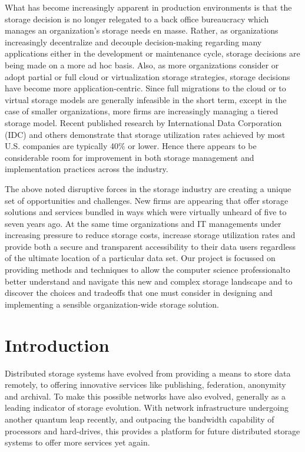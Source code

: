 \documentclass[11pt]{article}
\begin{document}
What has become increasingly apparent in production environments is
that the storage decision is no longer relegated to a back office
bureaucracy which manages an organization’s storage needs en masse.
Rather, as organizations increasingly decentralize and decouple
decision-making regarding many applications either in the development
or maintenance cycle, storage decisions are being made on a more ad
hoc basis. Also, as more organizations consider or adopt partial or
full cloud or virtualization storage strategies, storage decisions
have become more application-centric. Since full migrations to the
cloud or to virtual storage models are generally infeasible in the
short term, except in the case of smaller organizations, more firms
are increasingly managing a tiered storage model. Recent published
research by International Data Corporation (IDC) and others
demonstrate that storage utilization rates achieved by most
U.S. companies are typically 40\% or lower. Hence there appears to be
considerable room for improvement in both storage management and
implementation practices across the industry.

The above noted disruptive forces in the storage industry are creating
a unique set of opportunities and challenges. New firms are appearing
that offer storage solutions and services bundled in ways which were
virtually unheard of five to seven years ago. At the same time
organizations and IT managements under increasing pressure to reduce
storage costs, increase storage utilization rates and provide both a
secure and transparent accessibility to their data users regardless of
the ultimate location of a particular data set. Our project is
focussed on providing methods and techniques to allow the computer
science professionalto better understand and navigate this new and
complex storage landscape and to discover the choices and tradeoffs
that one must consider in designing and implementing a sensible
organization-wide storage solution.

\section{Introduction}
Distributed storage systems have evolved from providing a means to
store data remotely, to offering innovative services like publishing,
federation, anonymity and archival. To make this possible networks
have also evolved, generally as a leading indicator of storage
evolution. With network infrastructure undergoing another quantum leap
recently, and outpacing the bandwidth capability of processors and
hard-drives, this provides a platform for future distributed storage
systems to offer more services yet again.
\end{document}
